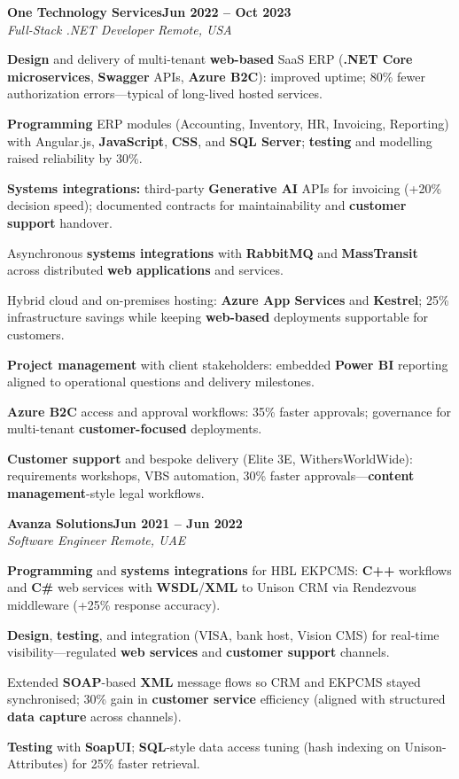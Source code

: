 \documentclass[letterpaper,10pt]{article}
\newcommand{\headingBf}[2]{
  \hspace{10pt}\textbf{#1}\hfill\textbf{#2}\\
}
\newcommand{\headingIt}[2]{
  \hspace{10pt}\textit{#1}\hfill\textit{#2}\\
}
\newenvironment{resume_list}{
  \vspace{-7pt}
  \begin{itemize}[itemsep=-2px, parsep=1pt, leftmargin=30pt]
}{
  \end{itemize}
}
\begin{document}
\headingBf{One Technology Services}{Jun 2022 -- Oct 2023}
\headingIt{Full-Stack .NET Developer \hfill Remote, USA}{}
\begin{resume_list}
    \item \textbf{Design} and delivery of multi-tenant \textbf{web-based} SaaS ERP (\textbf{.NET Core microservices}, \textbf{Swagger} APIs, \textbf{Azure B2C}): improved uptime; 80\% fewer authorization errors---typical of long-lived hosted services.
    \item \textbf{Programming} ERP modules (Accounting, Inventory, HR, Invoicing, Reporting) with Angular.js, \textbf{JavaScript}, \textbf{CSS}, and \textbf{SQL Server}; \textbf{testing} and modelling raised reliability by 30\%.
    \item \textbf{Systems integrations:} third-party \textbf{Generative AI} APIs for invoicing (+20\% decision speed); documented contracts for maintainability and \textbf{customer support} handover.
    \item Asynchronous \textbf{systems integrations} with \textbf{RabbitMQ} and \textbf{MassTransit} across distributed \textbf{web applications} and services.
    \item Hybrid cloud and on-premises hosting: \textbf{Azure App Services} and \textbf{Kestrel}; 25\% infrastructure savings while keeping \textbf{web-based} deployments supportable for customers.
    \item \textbf{Project management} with client stakeholders: embedded \textbf{Power BI} reporting aligned to operational questions and delivery milestones.
    \item \textbf{Azure B2C} access and approval workflows: 35\% faster approvals; governance for multi-tenant \textbf{customer-focused} deployments.
    \item \textbf{Customer support} and bespoke delivery (Elite 3E, WithersWorldWide): requirements workshops, VBS automation, 30\% faster approvals---\textbf{content management}-style legal workflows.
\end{resume_list}

\headingBf{Avanza Solutions}{Jun 2021 -- Jun 2022}
\headingIt{Software Engineer \hfill Remote, UAE}{}
\begin{resume_list}
    \item \textbf{Programming} and \textbf{systems integrations} for HBL EKPCMS: \textbf{C++} workflows and \textbf{C\#} web services with \textbf{WSDL}/\textbf{XML} to Unison CRM via Rendezvous middleware (+25\% response accuracy).
    \item \textbf{Design}, \textbf{testing}, and integration (VISA, bank host, Vision CMS) for real-time visibility---regulated \textbf{web services} and \textbf{customer support} channels.
    \item Extended \textbf{SOAP}-based \textbf{XML} message flows so CRM and EKPCMS stayed synchronised; 30\% gain in \textbf{customer service} efficiency (aligned with structured \textbf{data capture} across channels).
    \item \textbf{Testing} with \textbf{SoapUI}; \textbf{SQL}-style data access tuning (hash indexing on Unison-Attributes) for 25\% faster retrieval.
\end{resume_list}
\end{document}
